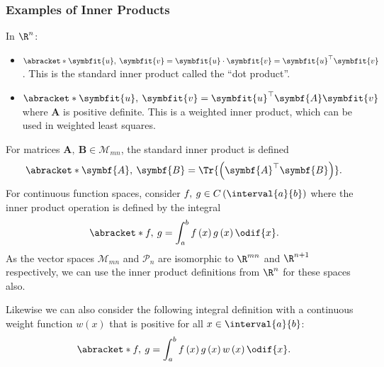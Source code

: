 \documentclass{article}
\begin{document}
\subsubsection{Examples of Inner Products}
In \(\R^n\):
\begin{itemize}
    \item \(\abracket*{\symbfit{u},\: \symbfit{v}} = \symbfit{u} \cdot \symbfit{v} = \symbfit{u}^\top \symbfit{v}\). This is the standard inner product called the ``dot product''.
    \item \(\abracket*{\symbfit{u},\: \symbfit{v}} = \symbfit{u}^\top \symbf{A} \symbfit{v}\) where \(\symbf{A}\) is positive definite. This is a weighted inner product, which can be used in weighted least squares.
\end{itemize}
For matrices \(\symbf{A},\: \symbf{B} \in \mathscr{M}_{mn}\), the standard inner product is defined
\begin{equation*}
    \abracket*{\symbf{A},\: \symbf{B}} = \Tr{\left( \symbf{A}^\top \symbf{B} \right)}.
\end{equation*}
For continuous function spaces, consider \(f,\: g \in C\left( \interval{a}{b} \right)\) where
the inner product operation is defined by the integral
\begin{equation*}
    \abracket*{f,\: g} = \int_a^b f\left( x \right) g\left( x \right) \odif{x}.
\end{equation*}
As the vector spaces \(\mathscr{M}_{mn}\) and \(\mathscr{P}_n\) are isomorphic to \(\R^{mn}\) and \(\R^{n + 1}\) respectively,
we can use the inner product definitions from \(\R^n\) for these spaces also.

Likewise we can also consider the following integral definition with a continuous weight function \(w\left( x \right)\) that is positive for all \(x \in \interval{a}{b}\):
\begin{equation*}
    \abracket*{f,\: g} = \int_a^b f\left( x \right) g\left( x \right) w\left( x \right) \odif{x}.
\end{equation*}
\end{document}
